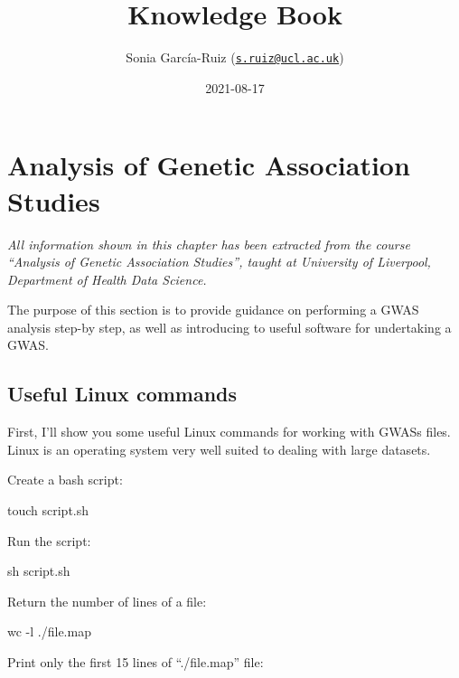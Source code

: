 \documentclass[]{book}
\title{Knowledge Book}
\author{Sonia García-Ruiz
(\href{mailto:s.ruiz@ucl.ac.uk}{\nolinkurl{s.ruiz@ucl.ac.uk}})}
\date{2021-08-17}
\newenvironment{Shaded}{\begin{snugshade}}{\end{snugshade}}
\newcommand{\FunctionTok}[1]{\textcolor[rgb]{0.00,0.00,0.00}{#1}}
\newcommand{\NormalTok}[1]{#1}
\begin{document}
\maketitle

{
\setcounter{tocdepth}{1}
\tableofcontents
}
\chapter{Analysis of Genetic Association
Studies}\label{analysis-of-genetic-association-studies}

\emph{All information shown in this chapter has been extracted from the
course ``Analysis of Genetic Association Studies'', taught at University
of Liverpool, Department of Health Data Science.}

The purpose of this section is to provide guidance on performing a GWAS
analysis step-by step, as well as introducing to useful software for
undertaking a GWAS.

\section{Useful Linux commands}\label{useful-linux-commands}

First, I'll show you some useful Linux commands for working with GWASs
files. Linux is an operating system very well suited to dealing with
large datasets.

Create a bash script:

\begin{Shaded}
\begin{Highlighting}[]
\FunctionTok{touch}\NormalTok{ script.sh}
\end{Highlighting}
\end{Shaded}

Run the script:

\begin{Shaded}
\begin{Highlighting}[]
\FunctionTok{sh}\NormalTok{ script.sh}
\end{Highlighting}
\end{Shaded}

Return the number of lines of a file:

\begin{Shaded}
\begin{Highlighting}[]
\FunctionTok{wc}\NormalTok{ -l ./file.map}
\end{Highlighting}
\end{Shaded}

Print only the first 15 lines of ``./file.map'' file:
\end{document}
